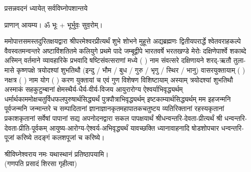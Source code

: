 
\setlength{\parindent}{0pt}




{प्रसन्नवदनं ध्यायेत् सर्वविघ्नोपशान्तये}
 
प्राणान्  आयम्य।  ॐ भूः + भूर्भुवः॒ सुव॒रोम्।


ममोपात्तसमस्तदुरितक्षयद्वारा श्रीपरमेश्वरप्रीत्यर्थं शुभे शोभने मुहूत्ते अद्यब्रह्मणः
द्वितीयपरार्द्धे श्वेतवराहकल्पे वैवस्वतमन्वन्तरे अष्टाविंशतितमे कलियुगे प्रथमे पादे
जम्बूद्वीपे भारतवर्षे भरतखण्डे मेरोः दक्षिणेपार्श्वे शकाब्दे अस्मिन् वर्तमाने व्यावहारिके
 प्रभवादि षष्टिसंवत्सराणां मध्ये (  ) नाम संवत्सरे दक्षिणायने 
शरद्-ऋतौ  तुला-मासे कृष्णपक्षे त्रयोदश्यां शुभतिथौ
(इन्दु / भौम / बुध / गुरु / भृगु / स्थिर / भानु) वासरयुक्तायाम्
(  ) नक्षत्र (  ) नाम  योग  (  ) करण युक्तायां च एवं गुण विशेषण विशिष्टायाम्
अस्याम् त्रयोदश्यां शुभतिथौ 
अस्माकं सहकुटुम्बानां क्षेमस्थैर्य-धैर्य-वीर्य-विजय आयुरारोग्य ऐश्वर्याभिवृद्ध्यर्थम्
 धर्मार्थकाममोक्ष\-चतुर्विधफलपुरुषार्थसिद्ध्यर्थं पुत्रपौत्राभि\-वृद्ध्यर्थम् इष्टकाम्यार्थसिद्ध्यर्थम्
मम इहजन्मनि पूर्वजन्मनि जन्मान्तरे च सम्पादितानां ज्ञानाज्ञानकृतमहा\-पातकचतुष्टय
व्यतिरिक्तानां रहस्यकृतानां प्रकाशकृतानां सर्वेषां पापानां सद्य अपनोदनद्वारा सकल 
पापक्षयार्थं
श्रीधन्वन्तरि-देवता-प्रीत्यर्थं श्री धन्वन्तरि-देवता-प्रीति-पूर्वकम् आयुष्य-आरोग्य-ऐश्वर्य-अभिवृद्ध्यर्थं 
यावच्छक्ति ध्यानावाहनादि 
षोडशोपचार धन्वन्तरि-पूजां करिष्ये तदङ्गं कलशपूजां च करिष्ये।


श्रीविघ्नेश्वराय नमः यथास्थानं प्रतिष्ठापयामि।\\
(गणपति प्रसादं शिरसा गृहीत्वा)














